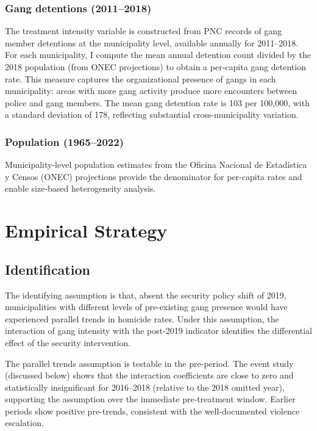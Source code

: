 \documentclass[12pt]{article}
\begin{document}
\subsubsection*{Gang detentions (2011--2018)} The treatment intensity variable is constructed from PNC records of gang member detentions at the municipality level, available annually for 2011--2018. For each municipality, I compute the mean annual detention count divided by the 2018 population (from ONEC projections) to obtain a per-capita gang detention rate. This measure captures the organizational presence of gangs in each municipality: areas with more gang activity produce more encounters between police and gang members. The mean gang detention rate is 103 per 100,000, with a standard deviation of 178, reflecting substantial cross-municipality variation.

\subsubsection*{Population (1965--2022)} Municipality-level population estimates from the Oficina Nacional de Estad\'istica y Censos (ONEC) projections provide the denominator for per-capita rates and enable size-based heterogeneity analysis.



\section{Empirical Strategy}

\subsection{Identification}

The identifying assumption is that, absent the security policy shift of 2019, municipalities with different levels of pre-existing gang presence would have experienced parallel trends in homicide rates. Under this assumption, the interaction of gang intensity with the post-2019 indicator identifies the differential effect of the security intervention.

The parallel trends assumption is testable in the pre-period. The event study (discussed below) shows that the interaction coefficients are close to zero and statistically insignificant for 2016--2018 (relative to the 2018 omitted year), supporting the assumption over the immediate pre-treatment window. Earlier periods show positive pre-trends, consistent with the well-documented violence escalation.
\end{document}
